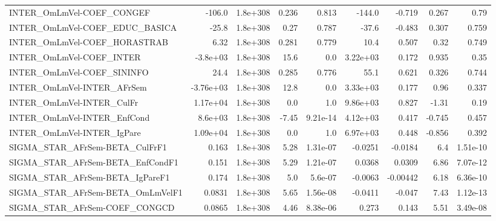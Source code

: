 \begin{tabular}{lrrrrrrrr}
INTER\_OmLmVel-COEF\_CONGEF             &      -106.0 &     1.8e+308 &   0.236 &    0.813 &     -144.0 &      -0.719 &        0.267 &          0.79 \\
INTER\_OmLmVel-COEF\_EDUC\_BASICA        &       -25.8 &     1.8e+308 &    0.27 &    0.787 &      -37.6 &      -0.483 &        0.307 &         0.759 \\
INTER\_OmLmVel-COEF\_HORASTRAB          &        6.32 &     1.8e+308 &   0.281 &    0.779 &       10.4 &       0.507 &         0.32 &         0.749 \\
INTER\_OmLmVel-COEF\_INTER              &    -3.8e+03 &     1.8e+308 &    15.6 &      0.0 &   3.22e+03 &       0.172 &        0.935 &          0.35 \\
INTER\_OmLmVel-COEF\_SININFO            &        24.4 &     1.8e+308 &   0.285 &    0.776 &       55.1 &       0.621 &        0.326 &         0.744 \\
INTER\_OmLmVel-INTER\_AFrSem            &   -3.76e+03 &     1.8e+308 &    12.8 &      0.0 &   3.33e+03 &       0.177 &         0.96 &         0.337 \\
INTER\_OmLmVel-INTER\_CulFr             &    1.17e+04 &     1.8e+308 &     0.0 &      1.0 &   9.86e+03 &       0.827 &        -1.31 &          0.19 \\
INTER\_OmLmVel-INTER\_EnfCond           &     8.6e+03 &     1.8e+308 &   -7.45 & 9.21e-14 &   4.12e+03 &       0.417 &       -0.745 &         0.457 \\
INTER\_OmLmVel-INTER\_IgPare            &    1.09e+04 &     1.8e+308 &     0.0 &      1.0 &   6.97e+03 &       0.448 &       -0.856 &         0.392 \\
SIGMA\_STAR\_AFrSem-BETA\_CulFrF1        &       0.163 &     1.8e+308 &    5.28 & 1.31e-07 &    -0.0251 &     -0.0184 &          6.4 &      1.51e-10 \\
SIGMA\_STAR\_AFrSem-BETA\_EnfCondF1      &       0.151 &     1.8e+308 &    5.29 & 1.21e-07 &     0.0368 &      0.0309 &         6.86 &      7.07e-12 \\
SIGMA\_STAR\_AFrSem-BETA\_IgPareF1       &       0.174 &     1.8e+308 &     5.0 &  5.6e-07 &    -0.0063 &    -0.00442 &         6.18 &      6.36e-10 \\
SIGMA\_STAR\_AFrSem-BETA\_OmLmVelF1      &      0.0831 &     1.8e+308 &    5.65 & 1.56e-08 &    -0.0411 &      -0.047 &         7.43 &      1.12e-13 \\
SIGMA\_STAR\_AFrSem-COEF\_CONGCD         &      0.0865 &     1.8e+308 &    4.46 & 8.38e-06 &      0.273 &       0.143 &         5.51 &      3.49e-08 \\

\end{tabular}

